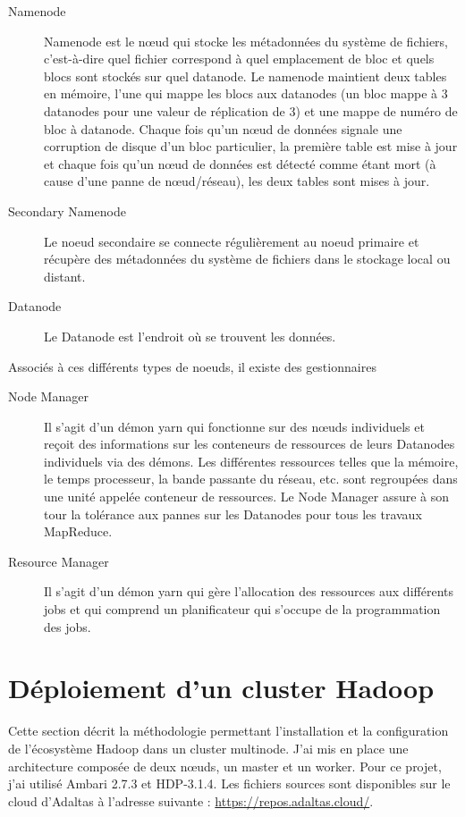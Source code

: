 \documentclass[12pt, french]{report}
\begin{document}
\begin{description}
  \item[Namenode] Namenode est le nœud qui stocke les métadonnées du système de fichiers, c'est-à-dire quel fichier correspond à quel emplacement de bloc et quels blocs sont stockés sur quel datanode. Le namenode maintient deux tables en mémoire, l'une qui mappe les blocs aux datanodes (un bloc mappe à 3 datanodes pour une valeur de réplication de 3) et une mappe de numéro de bloc à datanode. Chaque fois qu'un nœud de données signale une corruption de disque d'un bloc particulier, la première table est mise à jour et chaque fois qu'un nœud de données est détecté comme étant mort (à cause d'une panne de nœud/réseau), les deux tables sont mises à jour.
  \item[Secondary Namenode] Le noeud secondaire se connecte régulièrement au noeud primaire et récupère des métadonnées du système de fichiers dans le stockage local ou distant.
  \item[Datanode] Le Datanode est l'endroit où se trouvent les données.
\end{description}
Associés à ces différents types de noeuds, il existe des gestionnaires
\begin{description}
  \item[Node Manager] Il s'agit d'un démon yarn qui fonctionne sur des nœuds individuels et reçoit des informations sur les conteneurs de ressources de leurs Datanodes individuels via des démons. Les différentes ressources telles que la mémoire, le temps processeur, la bande passante du réseau, etc. sont regroupées dans une unité appelée conteneur de ressources. Le Node Manager assure à son tour la tolérance aux pannes sur les Datanodes pour tous les travaux MapReduce.
  \item[Resource Manager] Il s'agit d'un démon yarn qui gère l'allocation des ressources aux différents jobs et qui comprend un planificateur qui s'occupe de la programmation des jobs.
\end{description}

\chapter{Déploiement d’un cluster Hadoop}

Cette section décrit la méthodologie permettant l'installation et la configuration de l'écosystème Hadoop dans un cluster multinode. J'ai mis en place une architecture composée de deux nœuds, un master et un worker. Pour ce projet, j'ai utilisé Ambari 2.7.3 et HDP-3.1.4. Les fichiers sources sont disponibles sur le cloud d'Adaltas à l'adresse suivante : \href{https://repos.adaltas.cloud/}{https://repos.adaltas.cloud/}.
\end{document}
